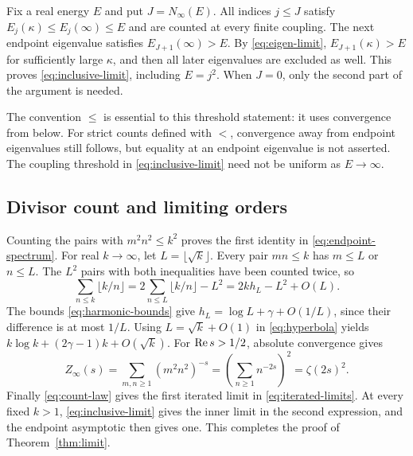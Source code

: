 Fix a real energy $E$ and put $J=N_\infty(E)$.
All indices $j\le J$ satisfy
$E_j(\kappa)\le E_j(\infty)\le E$ and are counted at
every finite coupling.
The next endpoint eigenvalue satisfies
$E_{J+1}(\infty)>E$.
By \eqref{eq:eigen-limit},
$E_{J+1}(\kappa)>E$ for sufficiently large $\kappa$,
and then all later eigenvalues are excluded as well.
This proves \eqref{eq:inclusive-limit}, including $E=j^2$.
When $J=0$, only the second part of the argument is needed.

The convention $\le$ is essential to this threshold
statement: it uses convergence from below.
For strict counts defined with $<$, convergence away from
endpoint eigenvalues still follows, but equality at an
endpoint eigenvalue is not asserted.
The coupling threshold in \eqref{eq:inclusive-limit}
need not be uniform as $E\to\infty$.

\subsection{Divisor count and limiting orders}

Counting the pairs with $m^2n^2\le k^2$ proves the first
identity in \eqref{eq:endpoint-spectrum}.
For real $k\to\infty$, let $L=\lfloor\sqrt k\rfloor$.
Every pair $mn\le k$ has $m\le L$ or $n\le L$.
The $L^2$ pairs with both inequalities have been counted
twice, so
\begin{equation}
\sum_{n\le k}\lfloor k/n\rfloor
=2\sum_{n\le L}\lfloor k/n\rfloor-L^2
=2kh_L-L^2+O(L).
\label{eq:hyperbola}
\end{equation}
The bounds \eqref{eq:harmonic-bounds} give
$h_L=\log L+\gamma+O(1/L)$, since their difference
is at most $1/L$.
Using $L=\sqrt k+O(1)$ in \eqref{eq:hyperbola}
yields
$k\log k+(2\gamma-1)k+O(\sqrt k)$.
For $\operatorname{Re} s>1/2$, absolute convergence gives
\[
Z_\infty(s)=
\sum_{m,n\ge1}(m^2n^2)^{-s}
=\left(\sum_{n\ge1}n^{-2s}\right)^2
=\zeta(2s)^2.
\]
Finally \eqref{eq:count-law} gives the first iterated
limit in \eqref{eq:iterated-limits}.
At every fixed $k>1$, \eqref{eq:inclusive-limit}
gives the inner limit in the second expression, and the
endpoint asymptotic then gives one.
This completes the proof of Theorem~\ref{thm:limit}.

